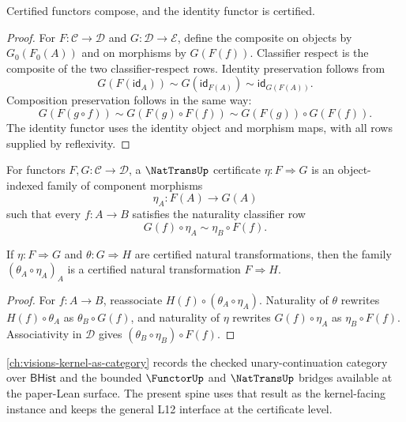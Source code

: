 \begin{theorem}
\label{thm:geometry-spine-functor-composition}
Certified functors compose, and the identity functor is certified.
\end{theorem}

\begin{proof}
For $F:\mathcal C\to\mathcal D$ and $G:\mathcal D\to\mathcal E$, define the
composite on objects by $G_0(F_0(A))$ and on morphisms by $G(F(f))$.
Classifier respect is the composite of the two classifier-respect rows.
Identity preservation follows from
$$
G(F(\mathsf{id}_A))
\sim
G(\mathsf{id}_{F(A)})
\sim
\mathsf{id}_{G(F(A))}.
$$
Composition preservation follows in the same way:
$$
G(F(g\circ f))
\sim
G(F(g)\circ F(f))
\sim
G(F(g))\circ G(F(f)).
$$
The identity functor uses the identity object and morphism maps, with all
rows supplied by reflexivity.
\end{proof}

\begin{definition}
\label{def:geometry-spine-nattrans}
For functors $F,G:\mathcal C\to\mathcal D$, a $\NatTransUp$ certificate
$\eta:F\Rightarrow G$ is an object-indexed family of component morphisms
$$
\eta_A:F(A)\to G(A)
$$
such that every $f:A\to B$ satisfies the naturality classifier row
$$
G(f)\circ\eta_A\sim\eta_B\circ F(f).
$$
\end{definition}

\begin{theorem}
\label{thm:geometry-spine-nattrans-vertical}
If $\eta:F\Rightarrow G$ and $\theta:G\Rightarrow H$ are certified natural
transformations, then the family $(\theta_A\circ\eta_A)_A$ is a certified
natural transformation $F\Rightarrow H$.
\end{theorem}

\begin{proof}
For $f:A\to B$, reassociate
$H(f)\circ(\theta_A\circ\eta_A)$.  Naturality of $\theta$ rewrites
$H(f)\circ\theta_A$ as $\theta_B\circ G(f)$, and naturality of $\eta$
rewrites $G(f)\circ\eta_A$ as $\eta_B\circ F(f)$.  Associativity in
$\mathcal D$ gives $(\theta_B\circ\eta_B)\circ F(f)$.
\end{proof}

\begin{remark}
\label{rem:geometry-spine-kernel-category-boundary}
\autoref{ch:visions-kernel-as-category} records the checked
unary-continuation category over $\mathsf{BHist}$ and the bounded
$\FunctorUp$ and $\NatTransUp$ bridges available at the paper-Lean surface.
The present spine uses that result as the kernel-facing instance and keeps the
general L12 interface at the certificate level.
\end{remark}


